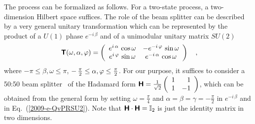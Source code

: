 \documentclass[%
 preprint,
 showpacs,
 showkeys,
 preprintnumbers,
 amsmath,amssymb,
 aps,
 prl,
  longbibliography,
 ]{revtex4-1}
\begin{document}
The process can be formalized as follows.
For a two-state process, a two-dimension Hilbert space suffices.
The role of the beam splitter can be described by a very general unitary transformation
which
can be represented by the product of a $U(1)$ phase $e^{-i\,\beta}$ and
of a unimodular unitary
matrix $SU(2)$~\cite{murnaghan}
\begin{equation}
\textsf{\textbf{ T}} (\omega ,\alpha ,\varphi )=
\left(
\begin{array}{cc}
{e^{i\,\alpha }}\,\cos \omega
&
{-e^{-i\,\varphi }}\,\sin \omega
\\
{e^{i\,\varphi }}\,\sin \omega
&
{e^{-i\,\alpha }}\,\cos \omega
 \end{array}
\right)
 \quad ,
\label{2009-e-QvPRSU2}
\end{equation}
where $-\pi \le \beta ,\omega \le \pi$,
$-\, {\pi \over 2} \le  \alpha ,\varphi \le {\pi \over 2}$.
For our purpose, it suffices to consider a 50:50 beam splitter~\cite{Mandel-Ou1987118,green-horn-zei,zeilinger:882,svozil-2004-analog}
of the Hadamard form
$
\textsf{\textbf{H}}= {1\over \sqrt{2}}
\left(
\begin{array}{rr}
1&1\\
1&-1
\end{array}
\right)$, which can be obtained from the general form by setting  $\omega =\frac{\pi}{4}$  and
$\alpha = \beta = \gamma =-\frac{\pi}{2}$  in $e^{-i\,\beta}$ and in Eq.~(\ref{2009-e-QvPRSU2}).
Note that $\textsf{\textbf{H}} \cdot \textsf{\textbf{H}} = \mathbb{I}_2$ is just the identity matrix in two dimensions.
\end{document}
